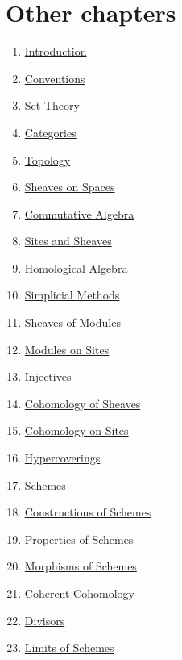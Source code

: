 \section{Other chapters}

\begin{multicols}{2}
\begin{enumerate}
\item \hyperref[introduction-section-phantom]{Introduction}
\item \hyperref[conventions-section-phantom]{Conventions}
\item \hyperref[sets-section-phantom]{Set Theory}
\item \hyperref[categories-section-phantom]{Categories}
\item \hyperref[topology-section-phantom]{Topology}
\item \hyperref[sheaves-section-phantom]{Sheaves on Spaces}
\item \hyperref[algebra-section-phantom]{Commutative Algebra}
\item \hyperref[sites-section-phantom]{Sites and Sheaves}
\item \hyperref[homology-section-phantom]{Homological Algebra}
\item \hyperref[simplicial-section-phantom]{Simplicial Methods}
\item \hyperref[modules-section-phantom]{Sheaves of Modules}
\item \hyperref[sites-modules-section-phantom]{Modules on Sites}
\item \hyperref[injectives-section-phantom]{Injectives}
\item \hyperref[cohomology-section-phantom]{Cohomology of Sheaves}
\item \hyperref[sites-cohomology-section-phantom]{Cohomology on Sites}
\item \hyperref[hypercovering-section-phantom]{Hypercoverings}
\item \hyperref[schemes-section-phantom]{Schemes}
\item \hyperref[constructions-section-phantom]{Constructions of Schemes}
\item \hyperref[properties-section-phantom]{Properties of Schemes}
\item \hyperref[morphisms-section-phantom]{Morphisms of Schemes}
\item \hyperref[coherent-section-phantom]{Coherent Cohomology}
\item \hyperref[divisors-section-phantom]{Divisors}
\item \hyperref[limits-section-phantom]{Limits of Schemes}

\end{enumerate}
\end{multicols}
